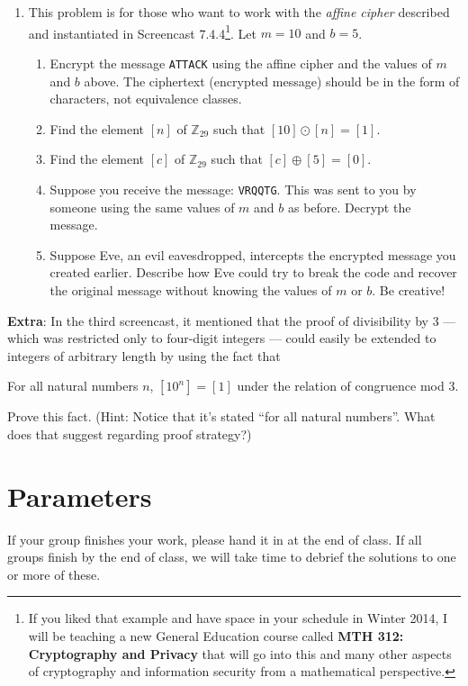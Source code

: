 \documentclass[11pt]{article}
\begin{document}
\begin{enumerate}
		\item This problem is for those who want to work with the \emph{affine cipher} described and instantiated in Screencast 7.4.4\footnote{If you liked that example and have space in your schedule in Winter 2014, I will be teaching a new General Education course called \textbf{MTH 312: Cryptography and Privacy} that will go into this and many other aspects of cryptography and information security from a mathematical perspective.}. Let $m = 10$ and $b = 5$. 
		\begin{enumerate}
			\item Encrypt the message \texttt{ATTACK} using the affine cipher and the values of $m$ and $b$ above. The ciphertext (encrypted message) should be in the form of characters, not equivalence classes. 
			\item Find the element $[n]$ of $\mathbb{Z}_{29}$ such that $[10] \odot [n] = [1]$.
			\item Find the element $[c]$ of $\mathbb{Z}_{29}$ such that $[c] \oplus [5] = [0]$.
			\item Suppose you receive the message: \texttt{VRQQTG}. This was sent to you by someone using the same values of $m$ and $b$ as before. Decrypt the message. 
			\item Suppose Eve, an evil eavesdropped, intercepts the encrypted message you created earlier. Describe how Eve could try to break the code and recover the original message without knowing the values of $m$ or $b$. Be creative! 
		\end{enumerate}	
	
\end{enumerate}


\textbf{Extra}: In the third screencast, it mentioned that the proof of divisibility by 3 --- which was restricted only to four-digit integers --- could easily be extended to integers of arbitrary length by using the fact that 
	\begin{center}
		For all natural numbers $n$, $[10^n] = [1]$ under the relation of congruence mod 3. 
	\end{center}
	Prove this fact. (Hint: Notice that it's stated ``for all natural numbers''. What does that suggest regarding proof strategy?)



\section*{Parameters}

If your group finishes your work, please hand it in at the end of class. If all groups finish by the end of class, we will take time to debrief the solutions to one or more of these. 
\end{document}
